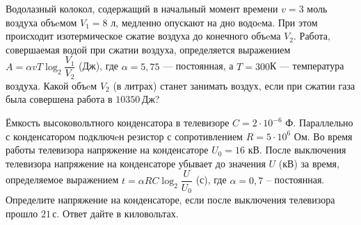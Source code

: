 %
%
\begin{class}[number=2]
	\begin{listofex}
		\item {}
		\item Водолазный колокол, содержащий в начальный момент времени  \( v = 3 \) моль воздуха объeмом \( V_1=8 \) л, медленно опускают на дно водоeма. При этом происходит изотермическое сжатие воздуха до конечного объeма \( V_2 \). Работа, совершаемая водой при сжатии воздуха, определяется выражением \( A=\alpha vT\log_2\dfrac{V_1}{V_2} \) (Дж), где \(  \alpha=5,75 \) --- постоянная, а \( T = 300 \)К --- температура воздуха. Какой объeм \( V_2 \) (в литрах) станет занимать воздух, если при сжатии газа была совершена работа в \( 10 350 \) Дж?	
		\item Ёмкость высоковольтного конденсатора в телевизоре \( C=2\cdot10^{-6} \) Ф. Параллельно с конденсатором подключeн резистор с сопротивлением \( R=5\cdot10^6 \) Ом. Во время работы телевизора напряжение на конденсаторе \(  U_0 = 16 \) кВ. После выключения телевизора напряжение на конденсаторе убывает до значения \( U \) (кВ) за время, определяемое выражением \( t=\alpha RC\log_2\dfrac{U}{U_0} \) (с), где \( \alpha=0,7 \) -- постоянная. Определите напряжение на конденсаторе, если после выключения телевизора прошло \( 21 \) с. Ответ дайте в киловольтах.
		\item {}
		\item {}
		\item {}
		\item {}
		\item {}
		\item {}
		\item {}
		\item {}
		\item {}
		\item {}
		\item {}
	\end{listofex}
\end{class}
%
%
%
